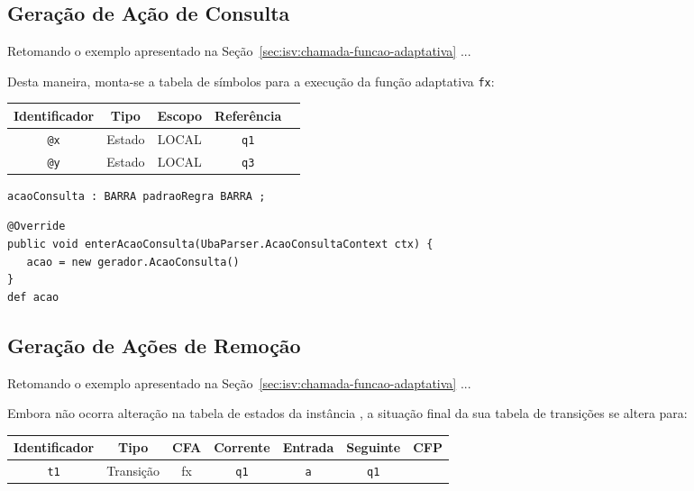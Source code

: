 \subsection{Geração de Ação de Consulta}
\label{sec:isv:geracao-consulta}

Retomando o exemplo apresentado na Seção~\ref{sec:isv:chamada-funcao-adaptativa} ...

Desta maneira, monta-se a tabela de símbolos para a execução da função adaptativa \lstinline|fx|:

  \begin{center}\begin{tabular}{c c c c c }
  Identificador   & Tipo  & Escopo    & Referência \\
  \hline
  \lstinline|@x|	& Estado & LOCAL  & \lstinline|q1| \\
  \lstinline|@y|	& Estado & LOCAL  & \lstinline|q3| \\
  \end{tabular}\end{center}

\begin{lstlisting}[style=antlr]
acaoConsulta : BARRA padraoRegra BARRA ;
\end{lstlisting}

\begin{lstlisting}
@Override
public void enterAcaoConsulta(UbaParser.AcaoConsultaContext ctx) {
   acao = new gerador.AcaoConsulta()
}
def acao
\end{lstlisting}

\subsection{Geração de Ações de Remoção}
\label{sec:isv:geracao-remocao}

Retomando o exemplo apresentado na Seção~\ref{sec:isv:chamada-funcao-adaptativa} ...

Embora não ocorra alteração na tabela de estados da instância , a situação final da sua tabela de transições se altera para:

   \begin{center}\begin{tabular}{c c c c c c c}
   Identificador   & Tipo  & CFA    & Corrente & Entrada & Seguinte & CFP \\
   \hline
   \lstinline|t1|	& Transição & fx  & \lstinline|q1| & \lstinline|a| & \lstinline|q1| &
   \end{tabular}\end{center}

